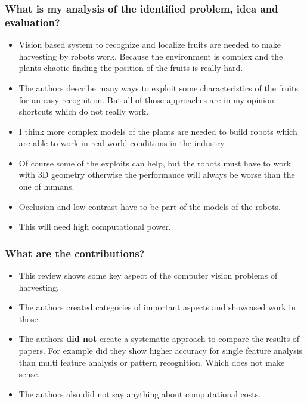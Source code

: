     \subsubsection*{What is my analysis of the identified problem, idea and evaluation?}
    \begin{itemize}
        \item Vision based system to recognize and localize fruits are needed to make harvesting by robots work. Because the environment is complex and the plants chaotic finding the position of the fruits is really hard.
        \item The authors describe many ways to exploit some characteristics of the fruits for an easy recognition. But all of those approaches are in my opinion shortcuts which do not really work.
        \item I think more complex models of the plants are needed to build robots which are able to work in real-world conditions in the industry.
        \item Of course some of the exploits can help, but the robots must have to work with 3D geometry otherwise the performance will always be worse than the one of humans. 
        \item Occlusion and low contrast have to be part of the models of the robots.
        \item This will need high computational power.
    \end{itemize}
    \subsubsection*{What are the contributions?}
    \begin{itemize}
        \item This review shows some key aspect of the computer vision problems of harvesting. 
        \item The authors created categories of important aspects and showcased work in those.
        \item The authors \textbf{did not} create a systematic approach to compare the results of papers. For example did they show higher accuracy for single feature analysis than multi feature analysis or pattern recognition. Which does not make sense.
        \item The authors also did not say anything about computational costs.
    \end{itemize}
